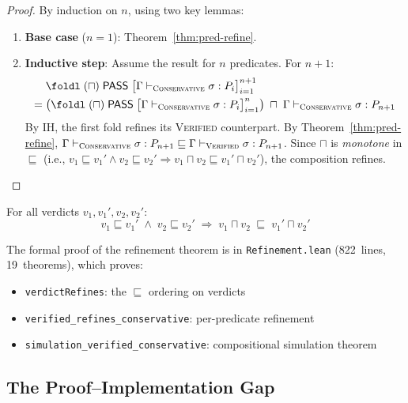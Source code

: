 \documentclass[acmsmall,review,anonymous]{acmart}
\newcommand{\PASS}{\ensuremath{\mathsf{PASS}}\xspace}
\newcommand{\tand}{\sqcap}
\newcommand{\seq}{\sigma}
\newcommand{\pred}{P}
\newcommand{\CONSERVATIVE}{\textsc{Conservative}\xspace}
\newcommand{\VERIFIED}{\textsc{Verified}\xspace}
\newcommand{\evalmode}[4]{#1 \vdash_{#2} #3 : #4}
\begin{document}
\begin{proof}
By induction on $n$, using two key lemmas:

\begin{enumerate}[leftmargin=*,itemsep=1pt,topsep=1pt]
\item \textbf{Base case} ($n = 1$):
  Theorem~\ref{thm:pred-refine}.

\item \textbf{Inductive step}:
  Assume the result for $n$ predicates.
  For $n + 1$:
  \begin{align*}
    &\foldl\;(\tand)\;\PASS\;
      \bigl[\evalmode{\Gamma}{\CONSERVATIVE}{\seq}{\pred_i}\bigr]_{i=1}^{n+1}
    \\ =\; &
      \bigl(\foldl\;(\tand)\;\PASS\;
        \bigl[\evalmode{\Gamma}{\CONSERVATIVE}{\seq}{\pred_i}\bigr]_{i=1}^{n}\bigr)
      \;\tand\;
      \evalmode{\Gamma}{\CONSERVATIVE}{\seq}{\pred_{n+1}}
  \end{align*}
  By IH, the first fold refines its \VERIFIED{} counterpart.
  By Theorem~\ref{thm:pred-refine},
  $\evalmode{\Gamma}{\CONSERVATIVE}{\seq}{\pred_{n+1}}
   \sqsubseteq
   \evalmode{\Gamma}{\VERIFIED}{\seq}{\pred_{n+1}}$.
  Since $\tand$ is \emph{monotone} in $\sqsubseteq$ (i.e.,
  $v_1 \sqsubseteq v_1' \wedge v_2 \sqsubseteq v_2'
   \Rightarrow v_1 \tand v_2 \sqsubseteq v_1' \tand v_2'$),
  the composition refines.\qedhere
\end{enumerate}
\end{proof}

\begin{lemma}[$\tand$-monotonicity in $\sqsubseteq$]\label{lem:tand-mono}
For all verdicts $v_1, v_1', v_2, v_2'$:
\[
  v_1 \sqsubseteq v_1' \;\wedge\; v_2 \sqsubseteq v_2'
  \;\Longrightarrow\;
  v_1 \tand v_2 \;\sqsubseteq\; v_1' \tand v_2'
\]
\end{lemma}

The formal proof of the refinement theorem is in
\texttt{Refinement.lean} (822~lines, 19~theorems), which proves:
\begin{itemize}[leftmargin=*,itemsep=0pt,topsep=1pt]
\item \texttt{verdictRefines}: the $\sqsubseteq$ ordering on verdicts
\item \texttt{verified\_refines\_conservative}: per-predicate refinement
\item \texttt{simulation\_verified\_conservative}: compositional
      simulation theorem
\end{itemize}

\subsection{The Proof--Implementation Gap}\label{sec:gap}
\end{document}
